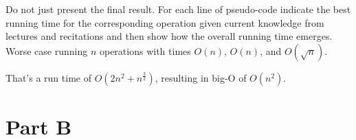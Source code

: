\documentclass[11pt]{article}
\begin{document}
\noindent Do not just present the final result. For each line of
pseudo-code indicate the best running time for the corresponding
operation given current knowledge from lectures and recitations and
then show how the overall running time emerges.\\


Worse case running $n$ operations with times $O(n)$, $O(n)$, and $O(\sqrt{n})$.

That's a run time of $O(2 n^2 + n^{\frac{3}{2}})$, resulting in big-O of $O(n^2)$.

\section*{Part B}
\end{document}
